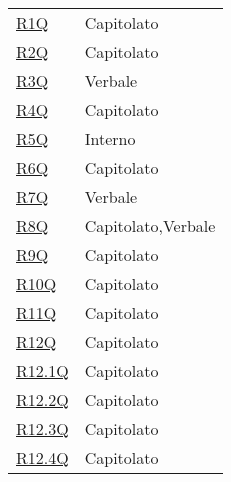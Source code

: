 \begin{center}
\begin{longtable}[!h]{p{50px} p{50px}}
        \hyperref[tab:RequisitiQualita]{R1Q}         & Capitolato                    \\
        \hyperref[tab:RequisitiQualita]{R2Q}         & Capitolato                    \\
        \hyperref[tab:RequisitiQualita]{R3Q}         & Verbale                       \\
        \hyperref[tab:RequisitiQualita]{R4Q}         & Capitolato                    \\
        \hyperref[tab:RequisitiQualita]{R5Q}         & Interno                       \\
        \hyperref[tab:RequisitiQualita]{R6Q}         & Capitolato                    \\
        \hyperref[tab:RequisitiQualita]{R7Q}         & Verbale                       \\
        \hyperref[tab:RequisitiQualita]{R8Q}         & Capitolato,\newline Verbale   \\
        \hyperref[tab:RequisitiQualita]{R9Q}         & Capitolato                    \\
        \hyperref[tab:RequisitiQualita]{R10Q}        & Capitolato                    \\
        \hyperref[tab:RequisitiVincolo]{R11Q}        & Capitolato                    \\
        \hyperref[tab:RequisitiVincolo]{R12Q}        & Capitolato                    \\
        \hyperref[tab:RequisitiVincolo]{R12.1Q}      & Capitolato                    \\
        \hyperref[tab:RequisitiVincolo]{R12.2Q}      & Capitolato                    \\
        \hyperref[tab:RequisitiVincolo]{R12.3Q}      & Capitolato                    \\
        \hyperref[tab:RequisitiVincolo]{R12.4Q}      & Capitolato                    \\



\end{longtable}
\end{center}
